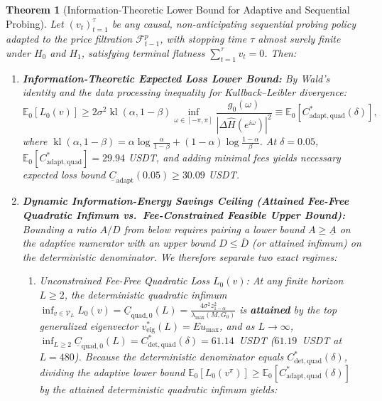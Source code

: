 \documentclass[12pt]{article}
\newtheorem{theorem}{Theorem}[section]
\theoremstyle{definition}
\theoremstyle{remark}
\begin{document}
\begin{theorem}[Information-Theoretic Lower Bound for Adaptive and Sequential Probing]
\label{thm:ia_adaptive_capital}
Let $(v_t)_{t=1}^\tau$ be any causal, non-anticipating sequential probing policy adapted to the price filtration $\mathcal{F}_{t-1}^p$, with stopping time $\tau$ almost surely finite under $H_0$ and $H_1$, satisfying terminal flatness $\sum_{t=1}^\tau v_t = 0$. Then:
\begin{enumerate}
\item \textbf{Information-Theoretic Expected Loss Lower Bound:} By Wald's identity and the data processing inequality for Kullback--Leibler divergence:
\begin{equation}
\mathbb{E}_0[L_0(v)] \ge 2 \sigma^2 \operatorname{kl}(\alpha, 1-\beta) \inf_{\omega \in [-\pi, \pi]} \frac{g_0(\omega)}{|\Delta \widehat{H}(e^{i\omega})|^2} \equiv \mathbb{E}_0[C^*_{\mathrm{adapt,quad}}(\delta)],
\end{equation}
where $\operatorname{kl}(\alpha, 1-\beta) = \alpha \log \frac{\alpha}{1-\beta} + (1-\alpha) \log \frac{1-\alpha}{\beta}$. At $\delta = 0.05$, $\mathbb{E}_0[C^*_{\mathrm{adapt,quad}}] = 29.94$ USDT, and adding minimal fees yields necessary expected loss bound $\underline{C}_{\mathrm{adapt}}(0.05) \ge 30.09$ USDT.
\item \textbf{Dynamic Information-Energy Savings Ceiling (Attained Fee-Free Quadratic Infimum vs.\ Fee-Constrained Feasible Upper Bound):} Bounding a ratio $A / D$ from below requires pairing a lower bound $A \ge \underline{A}$ on the adaptive numerator with an \emph{upper bound} $D \le \overline{D}$ (or attained infimum) on the deterministic denominator. We therefore separate two exact regimes:
\begin{enumerate}[label=(\alph*)]
\item \emph{Unconstrained Fee-Free Quadratic Loss $L_0(v)$:} At any finite horizon $L \ge 2$, the deterministic quadratic infimum $\inf_{v \in \mathcal{V}_L} L_0(v) = \underline{C}_{\mathrm{quad},0}(L) = \frac{4\sigma^2 z_{1-\alpha}^2}{\lambda_{\max}(M, G_0)}$ is \textbf{attained} by the top generalized eigenvector $v^*_{\mathrm{eig}}(L) = E u_{\max}$, and as $L \to \infty$, $\inf_{L \ge 2} \underline{C}_{\mathrm{quad},0}(L) = C^*_{\mathrm{det,quad}}(\delta) = 61.14$~USDT ($61.19$~USDT at $L=480$). Because the deterministic denominator equals $C^*_{\mathrm{det,quad}}(\delta)$, dividing the adaptive lower bound $\mathbb{E}_0[L_0(v^\pi)] \ge \mathbb{E}_0[C^*_{\mathrm{adapt,quad}}(\delta)]$ by the attained deterministic quadratic infimum yields:

\end{enumerate}
\end{enumerate}
\end{theorem}
\end{document}

